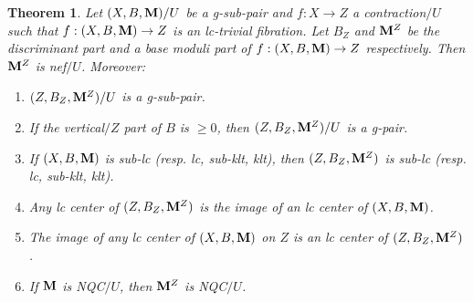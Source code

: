 \documentclass[11pt]{amsart}
\numberwithin{equation}{section}
\newcommand{\Mm}{{\bf{M}}}
\newtheorem{thm}{Theorem}[subsection]
\theoremstyle{definition}
\theoremstyle{definition}
\theoremstyle{definition}
\begin{document}
\begin{thm}\label{thm: cbf gpair nonnqc}
Let $(X,B,\Mm)/U$ be a g-sub-pair and $f: X\rightarrow Z$ a contraction$/U$ such that $f: (X,B,\Mm)\rightarrow Z$ is an lc-trivial fibration. Let $B_Z$ and $\Mm^Z$ be the discriminant part and a base moduli part of $f: (X,B,\Mm)\rightarrow Z$ respectively. Then $\Mm^Z$ is nef$/U$. Moreover:
\begin{enumerate}
    \item $(Z,B_Z,\Mm^Z)/U$ is a g-sub-pair.
    \item If the vertical$/Z$ part of $B$ is $\geq 0$, then $(Z,B_Z,\Mm^Z)/U$ is a g-pair.
    \item If $(X,B,\Mm)$ is sub-lc (resp. lc, sub-klt, klt), then $(Z,B_Z,\Mm^Z)$ is sub-lc (resp. lc, sub-klt, klt).
    \item Any lc center of $(Z,B_Z,\Mm^Z)$ is the image of an lc center of $(X,B,\Mm)$.
    \item The image of any lc center of $(X,B,\Mm)$ on $Z$ is an lc center of $(Z,B_Z,\Mm^Z)$.
    \item If $\Mm$ is NQC$/U$, then $\Mm^Z$ is NQC$/U$.
\end{enumerate}
\end{thm}
\end{document}
